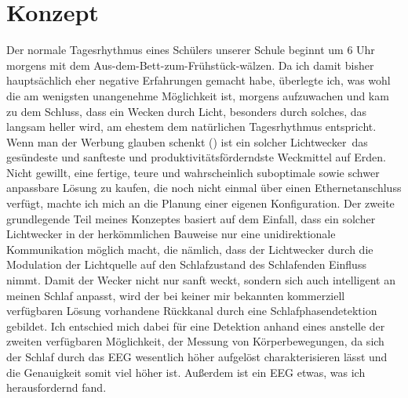 \documentclass[12pt,a4paper,notitlepage]{article}
\begin{document}
\section{Konzept}
Der normale Tagesrhythmus eines Schülers unserer Schule beginnt um 6 Uhr morgens mit dem Aus-dem-Bett-zum-Frühstück-wälzen. Da ich damit bisher hauptsächlich eher negative Erfahrungen gemacht habe, überlegte ich, was wohl die am wenigsten unangenehme Möglichkeit ist, morgens aufzuwachen und kam zu dem Schluss, dass ein Wecken durch Licht, besonders durch solches, das langsam heller wird, am ehestem dem natürlichen Tagesrhythmus entspricht. Wenn man der Werbung glauben schenkt (\cite{WERBUNG1}\cite{WERBUNG2}\cite{WERBUNG3}\cite{WERBUNG4}\cite{WERBUNG5}\cite{WERBUNG6}\cite{WERBUNG7}\cite{WERBUNG8})
ist ein solcher \glqq Lichtwecker\grqq\ das gesündeste und sanfteste und produktivitätsförderndste Weckmittel auf Erden\cite{SIESTA1}. Nicht gewillt, eine fertige, teure und wahrscheinlich suboptimale sowie schwer anpassbare Lösung zu kaufen, die noch nicht einmal über einen Ethernetanschluss verfügt, machte ich mich an die Planung einer eigenen Konfiguration. Der zweite grundlegende Teil meines Konzeptes basiert auf dem Einfall, dass ein solcher Lichtwecker in der herkömmlichen Bauweise nur eine unidirektionale Kommunikation möglich macht, die nämlich, dass der Lichtwecker durch die Modulation der Lichtquelle auf den Schlafzustand des Schlafenden Einfluss nimmt. Damit der Wecker nicht nur sanft weckt, sondern sich auch intelligent an meinen Schlaf anpasst, wird der bei keiner mir bekannten kommerziell verfügbaren Lösung vorhandene Rückkanal durch eine Schlafphasendetektion gebildet. Ich entschied mich dabei für eine Detektion anhand eines  anstelle der zweiten verfügbaren Möglichkeit, der Messung von Körperbewegungen, da sich der Schlaf durch das EEG wesentlich höher aufgelöst charakterisieren lässt und die Genauigkeit somit viel höher ist. Außerdem ist ein EEG etwas, was ich herausfordernd fand.

\end{document}

